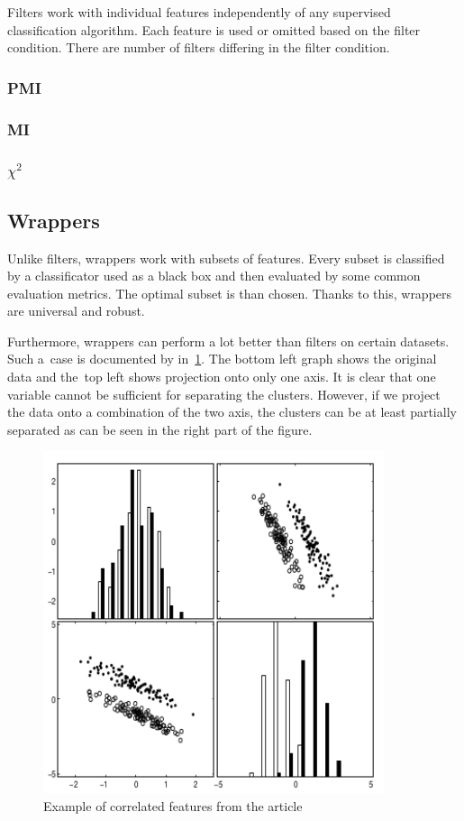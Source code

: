Filters work with individual features independently of any supervised classification algorithm. Each feature is used or omitted based on the filter condition. There are number of filters differing in the filter condition.

\subsubsection{PMI}

\subsubsection{MI}

\subsubsection{$\chi^2$}




\subsection{Wrappers}

Unlike filters, wrappers work with subsets of features. Every subset is classified by a classificator used as a black box and then evaluated by some common evaluation metrics. The optimal subset is than chosen. Thanks to this, wrappers are universal and robust.

Furthermore, wrappers can perform a lot better than filters on certain datasets. Such a~case is documented by \citet{GuyEli03} in~\ref{guyeli03-figure3}. The bottom left graph shows the original data and the~top left shows projection onto only one axis. It is clear that one variable cannot be sufficient for separating the clusters. However, if we project the data onto a combination of the two axis, the clusters can be at least partially separated as can be seen in the right part of the figure.
 

\begin{figure}[ht]\centering
\includegraphics[width=100mm]{../img/guyeli_figure3.png}
\caption{Example of correlated features from the article}
\label{guyeli03-figure3}
\end{figure}

